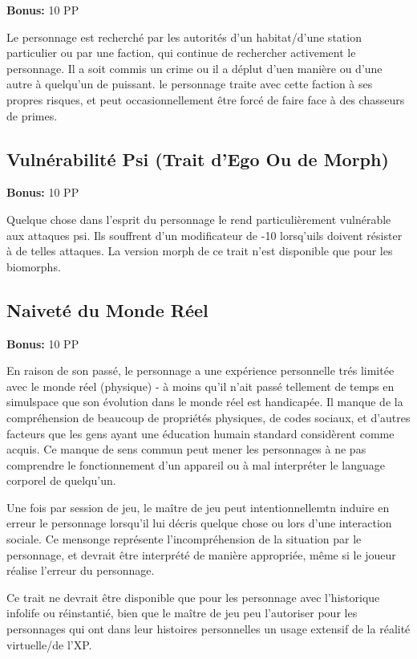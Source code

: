 \textbf{Bonus:} 10 PP 

Le personnage est recherché par les autorités d'un habitat/d'une station particulier ou par une faction, qui continue de rechercher activement le personnage. Il a soit commis un crime ou il a déplut d'uen manière ou d'une autre à quelqu'un de puissant. le personnage traite avec cette faction à ses propres risques, et peut occasionnellement être forcé de faire face à des chasseurs de primes. 

\subsection{Vulnérabilité Psi (Trait d'Ego Ou de Morph)} \label{sec:traits-psi-vulnerability} 

\textbf{Bonus:} 10 PP 

Quelque chose dans l'esprit du personnage le rend particulièrement vulnérable aux attaques psi. Ils souffrent d'un modificateur de -10 lorsq'uils doivent résister à de telles attaques. La version morph de ce trait n'est disponible que pour les biomorphs. 

\subsection{Naiveté du Monde Réel} \label{sec:traits-real-world-naivite} 

\textbf{Bonus:} 10 PP 

En raison de son passé, le personnage a une expérience personnelle trés limitée avec le monde réel (physique) - à moins qu'il n'ait passé tellement de temps en simulspace que son évolution dans le monde réel est handicapée. Il manque de la compréhension de beaucoup de propriétés physiques, de codes sociaux, et d'autres facteurs que les gens ayant une éducation humain standard considèrent comme acquis. Ce manque de sens commun peut mener les personnages à ne pas comprendre le fonctionnement d'un appareil ou à mal interpréter le language corporel de quelqu'un. 

Une fois par session de jeu, le maître de jeu peut intentionnellemtn induire en erreur le personnage lorsqu'il lui décris quelque chose ou lors d'une interaction sociale. Ce mensonge représente l'incompréhension de la situation par le personnage, et devrait être interprété de manière appropriée, même si le joueur réalise l'erreur du personnage. 

Ce trait ne devrait être disponible que pour les personnage avec l'historique infolife ou réinstantié, bien que le maître de jeu peu l'autoriser pour les personnages qui ont dans leur histoires personnelles un usage extensif de la réalité virtuelle/de l'XP. 

